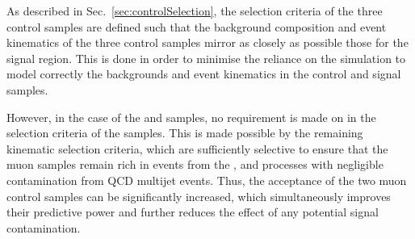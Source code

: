 As described in Sec.~\ref{sec:controlSelection}, the
selection criteria of the three control samples are defined such that
the background composition and event kinematics of the three control
samples mirror as closely as possible those for the signal
region. This is done in order to minimise the reliance on the
simulation to model correctly the backgrounds and event kinematics in
the control and signal samples.

However, in the case of the \mj and \mmj samples, no requirement is
made on \alphat in the selection criteria of the samples. This is made
possible by the remaining kinematic selection criteria, which are
sufficiently selective to ensure that the muon samples remain rich in
events from the \wj, \ttbar and \zmumu processes with negligible
contamination from QCD multijet events. Thus, the acceptance of the two 
muon control samples can be significantly increased, which simultaneously 
improves their predictive power and further reduces the effect of any potential
signal contamination. 



